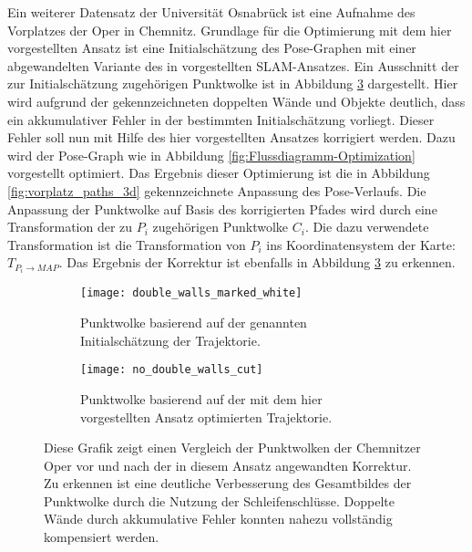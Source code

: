 Ein weiterer Datensatz der Universität Osnabrück ist eine Aufnahme des Vorplatzes der Oper in Chemnitz. Grundlage für die Optimierung mit dem hier vorgestellten Ansatz ist eine Initialschätzung des Pose-Graphen mit einer abgewandelten Variante des in \cite{zhang2014loam} vorgestellten SLAM-Ansatzes. Ein Ausschnitt der zur Initialschätzung zugehörigen Punktwolke ist in Abbildung \ref{fig:chemnitz_double_walls} dargestellt. Hier wird aufgrund der gekennzeichneten doppelten Wände und Objekte deutlich, dass ein akkumulativer Fehler in der bestimmten Initialschätzung vorliegt. Dieser Fehler soll nun mit Hilfe des hier vorgestellten Ansatzes korrigiert werden. Dazu wird der Pose-Graph wie in Abbildung \ref{fig:Flussdiagramm-Optimization} vorgestellt optimiert. Das Ergebnis dieser Optimierung ist die in Abbildung \ref{fig:vorplatz_paths_3d} gekennzeichnete Anpassung des Pose-Verlaufs. Die Anpassung der Punktwolke auf Basis des korrigierten Pfades wird durch eine Transformation der zu $P_i$ zugehörigen Punktwolke $C_i$. Die dazu verwendete Transformation ist die Transformation von $P_i$ ins Koordinatensystem der Karte: $T_{P_i \rightarrow MAP}$. Das Ergebnis der Korrektur ist ebenfalls in Abbildung \ref{fig:chemnitz_double_walls} zu erkennen.

\begin{figure}
	\centering
	\begin{subfigure}{.5\textwidth}
		 \centering
  		 \texttt{[image: double\_walls\_marked\_white]}
  		 \centering \caption{Punktwolke basierend auf der genannten Initialschätzung der Trajektorie.}
  		 \label{fig:double_walls_marked}
	\end{subfigure}%
	\begin{subfigure}{.5\textwidth}
    	\centering
  		\texttt{[image: no\_double\_walls\_cut]}
  		\centering \caption{Punktwolke basierend auf der mit dem hier vorgestellten Ansatz optimierten Trajektorie.}
  		\label{fig:no_double_walls_cut}
	\end{subfigure}
	\caption{Diese Grafik zeigt einen Vergleich der Punktwolken der Chemnitzer Oper vor und nach der in diesem Ansatz angewandten Korrektur. Zu erkennen ist eine deutliche Verbesserung des Gesamtbildes der Punktwolke durch die Nutzung der Schleifenschlüsse. Doppelte Wände durch akkumulative Fehler konnten nahezu vollständig kompensiert werden.}
	\label{fig:chemnitz_double_walls}
\end{figure}



